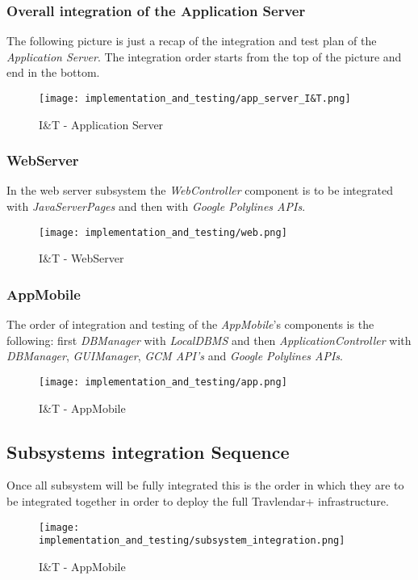 \subsubsection{Overall integration of the Application Server}
The following picture is just a recap of the integration and test plan of the \textit{Application Server}. The integration order starts from the top of the picture and end in the bottom.
\begin{figure}[H]
	\begin{center}
		\texttt{[image: implementation\_and\_testing/app\_server\_I\&T.png]}
	\end{center}
	\caption{I\&T - Application Server}
\end{figure}
\newpage
\subsubsection{WebServer}
In the web server subsystem the \textit{WebController} component is to be integrated with \textit{JavaServerPages} and then with \textit{Google Polylines APIs}. 
\begin{figure}[H]
	\begin{center}
		\texttt{[image: implementation\_and\_testing/web.png]}
	\end{center}
	\caption{I\&T - WebServer}
\end{figure}

\subsubsection{AppMobile}
The order of integration and testing of the \textit{AppMobile}'s components is the following: first \textit{DBManager} with \textit{LocalDBMS} and then \textit{ApplicationController} with \textit{DBManager}, \textit{GUIManager}, \textit{GCM API's} and \textit{Google Polylines APIs}. 
\begin{figure}[H]
	\begin{center}
		\texttt{[image: implementation\_and\_testing/app.png]}
	\end{center}
	\caption{I\&T - AppMobile}
\end{figure}
\newpage
\subsection{Subsystems integration Sequence}
Once all subsystem will be fully integrated this is the order in which they are to be integrated together in order to deploy the full Travlendar+ infrastructure.
\begin{figure}[H]
	\begin{center}
		\texttt{[image: implementation\_and\_testing/subsystem\_integration.png]}
	\end{center}
	\caption{I\&T - AppMobile}
\end{figure}